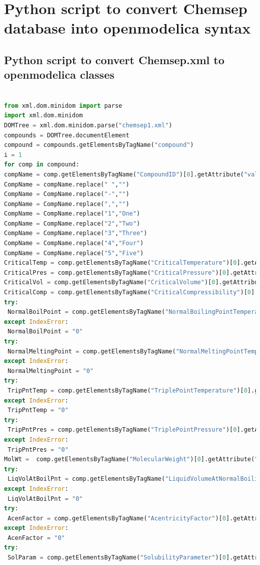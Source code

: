 \documentclass[12pt]{report}
\begin{document}
\chapter{Python script to convert Chemsep database into openmodelica syntax}
\label{appenC}
\section{Python script to convert Chemsep.xml to openmodelica classes}
\begin{lstlisting}[language=Python]

from xml.dom.minidom import parse
import xml.dom.minidom
DOMTree = xml.dom.minidom.parse("chemsep1.xml")
compounds = DOMTree.documentElement
compound = compounds.getElementsByTagName("compound")
i = 1
for comp in compound:
compName = comp.getElementsByTagName("CompoundID")[0].getAttribute("value")
CompName = compName.replace(" ","")
CompName = CompName.replace("-","")
CompName = CompName.replace(",","")
CompName = CompName.replace("1","One")
CompName = CompName.replace("2","Two")
CompName = CompName.replace("3","Three")
CompName = CompName.replace("4","Four")
CompName = CompName.replace("5","Five")
CriticalTemp = comp.getElementsByTagName("CriticalTemperature")[0].getAttribute("value")
CriticalPres = comp.getElementsByTagName("CriticalPressure")[0].getAttribute("value")  
CriticalVol = comp.getElementsByTagName("CriticalVolume")[0].getAttribute("value")
CriticalComp = comp.getElementsByTagName("CriticalCompressibility")[0].getAttribute("value")   
try:
 NormalBoilPoint = comp.getElementsByTagName("NormalBoilingPointTemperature")[0].getAttribute("value")
except IndexError:
 NormalBoilPoint = "0"
try:  
 NormalMeltingPoint = comp.getElementsByTagName("NormalMeltingPointTemperature")[0].getAttribute("value")   
except IndexError:
 NormalMeltingPoint = "0"
try:
 TripPntTemp = comp.getElementsByTagName("TriplePointTemperature")[0].getAttribute("value")  
except IndexError:
 TripPntTemp = "0" 
try:
 TripPntPres = comp.getElementsByTagName("TriplePointPressure")[0].getAttribute("value")
except IndexError:
 TripPntPres = "0"
MolWt =  comp.getElementsByTagName("MolecularWeight")[0].getAttribute("value")  
try:   
 LiqVolAtBoilPnt = comp.getElementsByTagName("LiquidVolumeAtNormalBoilingPoint")[0].getAttribute("value")  
except IndexError:
 LiqVolAtBoilPnt = "0"
try:
 AcenFactor = comp.getElementsByTagName("AcentricityFactor")[0].getAttribute("value")   
except IndexError:
 AcenFactor = "0"
try:
 SolParam = comp.getElementsByTagName("SolubilityParameter")[0].getAttribute("value")

\end{lstlisting}
\end{document}
